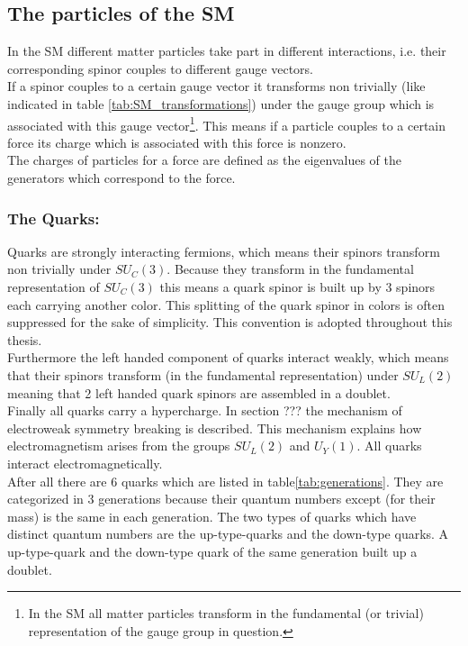 \subsection{The particles of the SM}
In the SM different matter particles take part in different interactions, i.e. their corresponding spinor couples to different gauge vectors.\\
If a spinor couples to a certain gauge vector it transforms  non trivially (like indicated in table \ref{tab:SM_transformations}) under the gauge group which is associated with this gauge vector\footnote{In the SM all matter particles transform in the fundamental (or trivial) representation of the gauge group in question.}. This means if a particle couples to a certain force its charge which is associated with this force is nonzero.\\
The charges of particles for a force are defined as the eigenvalues of the generators which correspond to the force.
\subsubsection*{The Quarks:}
Quarks are strongly interacting fermions, which means their spinors transform non trivially under $SU_C(3)$. Because they transform in the fundamental representation of $SU_C(3)$ this means a quark spinor is built up by 3 spinors each carrying another color. This splitting of the quark spinor in colors is often suppressed for the sake of simplicity. This convention is adopted throughout this thesis.\\
Furthermore the left handed component of quarks interact weakly, which means that their spinors transform (in the fundamental representation) under $SU_L(2)$ meaning that 2 left handed quark spinors are assembled in a doublet.\\
Finally all quarks carry a hypercharge. In section ??? the mechanism of electroweak symmetry breaking is described. This mechanism explains how electromagnetism arises from the groups $SU_L(2)$ and $U_Y(1)$. All quarks interact electromagnetically.\\
After all there are 6 quarks which are listed in table\ref{tab:generations}. They are categorized in 3 generations because their quantum numbers except (for their mass) is the same in each generation. The two types of quarks which have distinct quantum numbers are the up-type-quarks and the down-type quarks. A up-type-quark and the down-type quark of the same generation built up a doublet.
